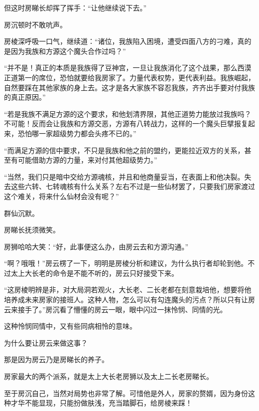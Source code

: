 \begin{this_body}
但这时房睇长却挥了挥手：“让他继续说下去。”

房沉顿时不敢吭声。

房棱深呼吸一口气，继续道：“诸位，我族陷入困境，遭受四面八方的刁难，真的是因为我族和方源这个魔头合作过吗？”

“并不是！真正的本质是我族得了豆神宫，一旦让我族消化了这个战果，那么西漠正道第一的席位，恐怕就要给我房家了。力量代表权势，更代表利益。我族崛起，自然要踩在其他家族的身上去。这才是各大家族不容忍我族，齐齐出手要对付我族的真正原因。”

“若是我族不满足方源的这个要求，和他划清界限，其他正道势力能放过我族吗？不可能！反而会让我族和方源交恶，方源有八转战力，这样的一个魔头巨擘报复起来，恐怕哪一家超级势力都会头疼不已的。”

“而满足方源的信中要求，不只是我族和他之前的盟约，更能拉近双方的关系，甚至有可能借助方源的力量，来对付其他超级势力。”

“当然，我们只是暗中交给方源魂核，并且和他商量妥当，在表面上和他决裂。失去这些六转、七转魂核有什么关系？左右不过是一些仙材罢了，只要我们房家渡过这个难关，将来什么仙材会没有呢？”

群仙沉默。

房睇长抚须微笑。

房狮哈哈大笑：“好，此事便这么办，由房云去和方源沟通。”

“啊？哦哦！”房云楞了一下，明明是房棱分析和建议，为什么执行者却轮到他。不过太上大长老的命令是不能不听的，房云只好接受下来。

“这房棱明辨是非，对大局洞若观火，大长老、二长老都在刻意栽培他，想要将他培养成未来房家的接班人。这种人物，怎么可以有勾连魔头的污点？所以只有让房云来接手了。”房沉看了懵懂的房云一眼，眼中闪过一抹怜悯、同情的光。

这种怜悯同情中，又有些同病相怜的意味。

为什么要让房云来做这事？

那是因为房云乃是房睇长的养子。

房家最大的两个派系，就是太上大长老房狮以及太上二长老房睇长。

至于房沉自己，当然对局势也非常了解。可惜他是外人，房家的赘婿，因为身份这种才华不能显现，只能扮做肤浅，充当踏脚石，给房棱来踩！

\end{this_body}

